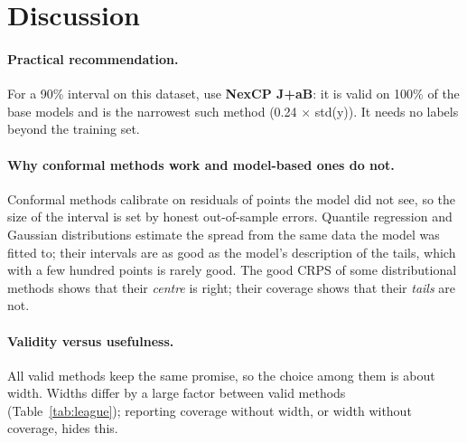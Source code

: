 \documentclass[11pt]{article}
\begin{document}
\FloatBarrier
\section{Discussion}\label{sec:discussion}
\paragraph{Practical recommendation.} For a 90\% interval on this dataset, use \textbf{NexCP J+aB}: it is valid on 100\% of the base models and is the narrowest such method (0.24 $\times$ std(y)). It needs no labels beyond the training set.
\paragraph{Why conformal methods work and model-based ones do not.} Conformal methods calibrate on residuals of points the model did not
see, so the size of the interval is set by honest out-of-sample errors. Quantile regression and Gaussian distributions estimate the spread
from the same data the model was fitted to; their intervals are as good as the model's description of the tails, which with a few hundred
points is rarely good. The good CRPS of some distributional methods shows that their \emph{centre} is right; their coverage shows that their
\emph{tails} are not.
\paragraph{Validity versus usefulness.} All valid methods keep the same promise, so the choice among them is about width. Widths differ by
a large factor between valid methods (Table~\ref{tab:league}); reporting coverage without width, or width without coverage, hides this.
\end{document}
